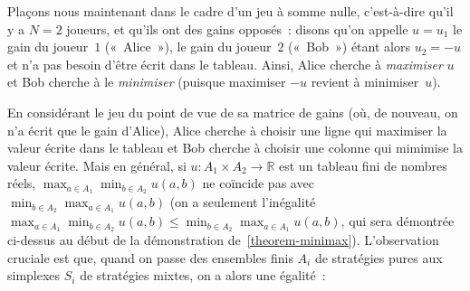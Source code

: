 \documentclass[12pt,a4paper]{article}
\theoremstyle{definition}
\begin{document}
Plaçons nous maintenant dans le cadre d'un jeu à somme nulle,
c'est-à-dire qu'il y a $N=2$ joueurs, et qu'ils ont des gains
opposés : disons qu'on appelle $u = u_1$ le gain du joueur $1$
(« Alice »), le gain du joueur $2$ (« Bob ») étant alors $u_2 = -u$ et
n'a pas besoin d'être écrit dans le tableau.  Ainsi, Alice cherche à
\emph{maximiser} $u$ et Bob cherche à le \emph{minimiser} (puisque
maximiser $-u$ revient à minimiser $u$).

En considérant le jeu du point de vue de sa matrice de gains (où, de
nouveau, on n'a écrit que le gain d'Alice), Alice cherche à choisir
une ligne qui maximiser la valeur écrite dans le tableau et Bob
cherche à choisir une colonne qui mimimise la valeur écrite.  Mais en
général, si $u\colon A_1 \times A_2 \to \mathbb{R}$ est un tableau
fini de nombres réels, $\max_{a \in A_1} \min_{b\in A_2} u(a,b)$ ne
coïncide pas avec $\min_{b\in A_2} \max_{a \in A_1} u(a,b)$ (on a
seulement l'inégalité $\max_{a \in A_1} \min_{b\in A_2} u(a,b) \leq
\min_{b\in A_2} \max_{a \in A_1} u(a,b)$, qui sera démontrée ci-dessus
au début de la démonstration de \ref{theorem-minimax}).  L'observation
cruciale est que, quand on passe des ensembles finis $A_i$ de
stratégies pures aux simplexes $S_i$ de stratégies mixtes, on a alors
une égalité :
\end{document}
